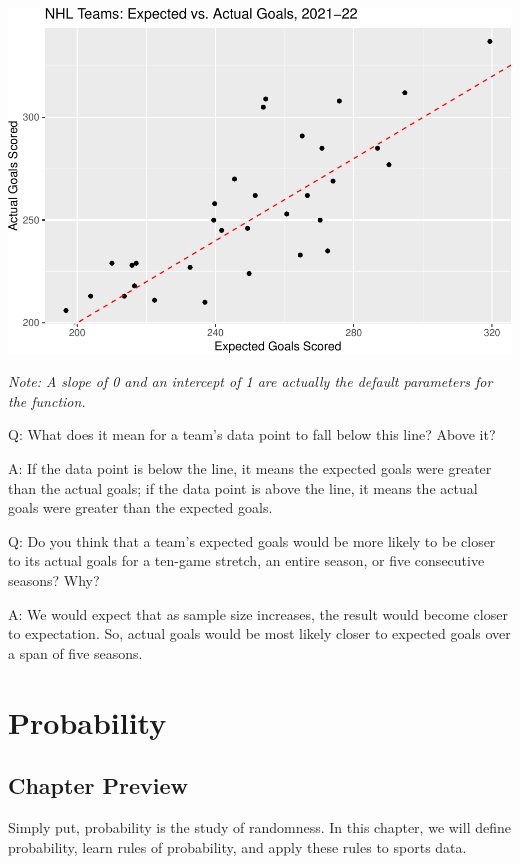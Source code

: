 \documentclass[
  11pt,
]{book}
\theoremstyle{definition}
\theoremstyle{definition}
\theoremstyle{definition}
\theoremstyle{definition}
\theoremstyle{remark}
\begin{document}
\includegraphics{series_files/figure-latex/hockey_ggplot4-1.pdf}

\emph{Note: A slope of 0 and an intercept of 1 are actually the default parameters for the function.}

Q: What does it mean for a team's data point to fall below this line? Above it?

A: If the data point is below the line, it means the expected goals were greater than the actual goals; if the data point is above the line, it means the actual goals were greater than the expected goals.

Q: Do you think that a team's expected goals would be more likely to be closer to its actual goals for a ten-game stretch, an entire season, or five consecutive seasons? Why?

A: We would expect that as sample size increases, the result would become closer to expectation. So, actual goals would be most likely closer to expected goals over a span of five seasons.

\hypertarget{probability}{%
\chapter{Probability}\label{probability}}

\hypertarget{chapter-preview}{%
\section*{Chapter Preview}\label{chapter-preview}}

Simply put, probability is the study of randomness. In this chapter, we will define probability, learn rules of probability, and apply these rules to sports data.
\end{document}
